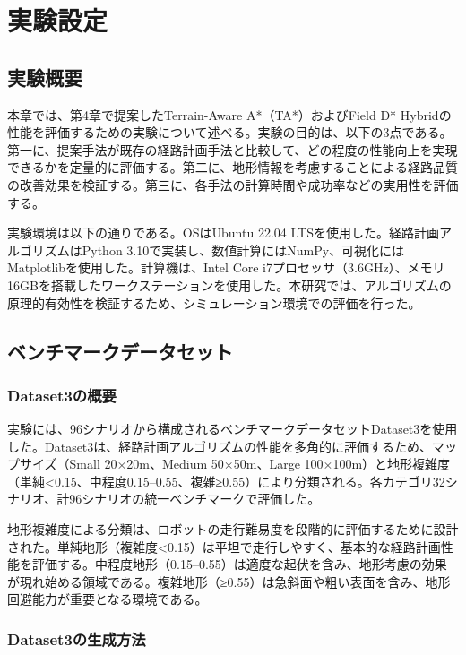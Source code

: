 \chapter{実験設定}

\section{実験概要}

本章では、第4章で提案したTerrain-Aware A*（TA*）およびField D* Hybridの性能を評価するための実験について述べる。実験の目的は、以下の3点である。第一に、提案手法が既存の経路計画手法と比較して、どの程度の性能向上を実現できるかを定量的に評価する。第二に、地形情報を考慮することによる経路品質の改善効果を検証する。第三に、各手法の計算時間や成功率などの実用性を評価する。

実験環境は以下の通りである。OSはUbuntu 22.04 LTSを使用した。経路計画アルゴリズムはPython 3.10で実装し、数値計算にはNumPy、可視化にはMatplotlibを使用した。計算機は、Intel Core i7プロセッサ（3.6GHz）、メモリ16GBを搭載したワークステーションを使用した。本研究では、アルゴリズムの原理的有効性を検証するため、シミュレーション環境での評価を行った。

\section{ベンチマークデータセット}

\subsection{Dataset3の概要}

実験には、96シナリオから構成されるベンチマークデータセットDataset3を使用した。Dataset3は、経路計画アルゴリズムの性能を多角的に評価するため、マップサイズ（Small 20×20m、Medium 50×50m、Large 100×100m）と地形複雑度（単純<0.15、中程度0.15--0.55、複雑≥0.55）により分類される。各カテゴリ32シナリオ、計96シナリオの統一ベンチマークで評価した。

地形複雑度による分類は、ロボットの走行難易度を段階的に評価するために設計された。単純地形（複雑度<0.15）は平坦で走行しやすく、基本的な経路計画性能を評価する。中程度地形（0.15--0.55）は適度な起伏を含み、地形考慮の効果が現れ始める領域である。複雑地形（≥0.55）は急斜面や粗い表面を含み、地形回避能力が重要となる環境である。

\subsection{Dataset3の生成方法}

